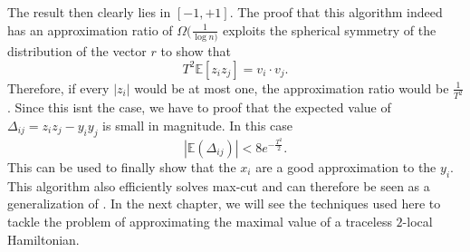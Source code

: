 The result then clearly lies in $\left[ -1,+1\right]$.
The proof that this algorithm indeed has an approximation ratio of $\Omega(\frac{1}{\log{}n)}$ exploits the spherical symmetry of the distribution of the vector $r$ to show that \[
T^2\mathbb{E}\left[ z_iz_j \right] = v_i\cdot v_j
.\]
Therefore, if every $\left| z_i \right| $ would be at most one, the approximation ratio would be $\frac{1}{T^2}$.
Since this isnt the case, we have to proof that the expected value of $\Delta_{ij}=z_iz_j - y_iy_j$ is small in magnitude.
In this case \[
	\left|\mathbb{E}(\Delta_{ij})\right|<8e^{-\frac{T^2}{2}}
.\]
This can be used to finally show that the $x_i$ are a good approximation to the $y_i$.
This algorithm also efficiently solves max-cut and can therefore be seen as a generalization of \cite{goemans95}.
In the next chapter, we will see the techniques used here to tackle the problem of approximating the maximal value of a traceless $2$-local Hamiltonian.
